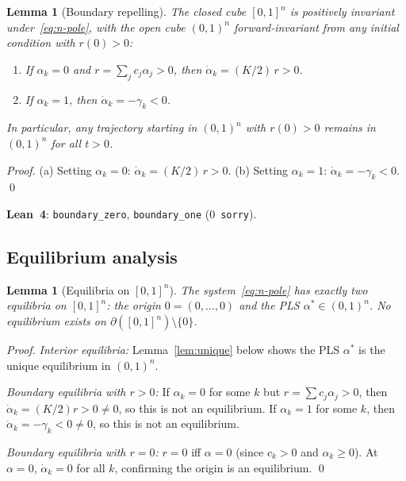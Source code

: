 \documentclass[11pt,a4paper]{article}
\newtheorem{lemma}[theorem]{Lemma}
\theoremstyle{definition}
\begin{document}
\begin{lemma}[Boundary repelling]\label{lem:trapping}
The closed cube $[0,1]^n$ is positively invariant under~\eqref{eq:n-pole}, with the open cube $(0,1)^n$ forward-invariant from any initial condition with $r(0) > 0$:
\begin{enumerate}[label=(\alph*)]
\item If $\alpha_k = 0$ and $r = \sum_j c_j\alpha_j > 0$, then $\dot{\alpha}_k = (K/2)\,r > 0$.
\item If $\alpha_k = 1$, then $\dot{\alpha}_k = -\gamma_k < 0$.
\end{enumerate}
In particular, any trajectory starting in $(0,1)^n$ with $r(0) > 0$ remains in $(0,1)^n$ for all $t > 0$.
\end{lemma}

\begin{proof}
(a) Setting $\alpha_k = 0$: $\dot{\alpha}_k = (K/2)\,r > 0$.
(b) Setting $\alpha_k = 1$: $\dot{\alpha}_k = -\gamma_k < 0$. \qed
\end{proof}

\textbf{Lean~4}: \texttt{boundary\_zero}, \texttt{boundary\_one} (0~\texttt{sorry}).

\subsection{Equilibrium analysis}

\begin{lemma}[Equilibria on ${[0,1]}^n$]\label{lem:equil}
The system~\eqref{eq:n-pole} has exactly two equilibria on $[0,1]^n$: the origin $0 = (0,\ldots,0)$ and the PLS $\alpha^* \in (0,1)^n$. No equilibrium exists on $\partial([0,1]^n) \setminus \{0\}$.
\end{lemma}

\begin{proof}
\emph{Interior equilibria:} Lemma~\ref{lem:unique} below shows the PLS $\alpha^*$ is the unique equilibrium in $(0,1)^n$.

\emph{Boundary equilibria with $r > 0$:} If $\alpha_k = 0$ for some $k$ but $r = \sum c_j\alpha_j > 0$, then $\dot{\alpha}_k = (K/2)r > 0 \neq 0$, so this is not an equilibrium. If $\alpha_k = 1$ for some $k$, then $\dot{\alpha}_k = -\gamma_k < 0 \neq 0$, so this is not an equilibrium.

\emph{Boundary equilibria with $r = 0$:} $r = 0$ iff $\alpha = 0$ (since $c_k > 0$ and $\alpha_k \geq 0$). At $\alpha = 0$, $\dot{\alpha}_k = 0$ for all $k$, confirming the origin is an equilibrium. \qed
\end{proof}
\end{document}
